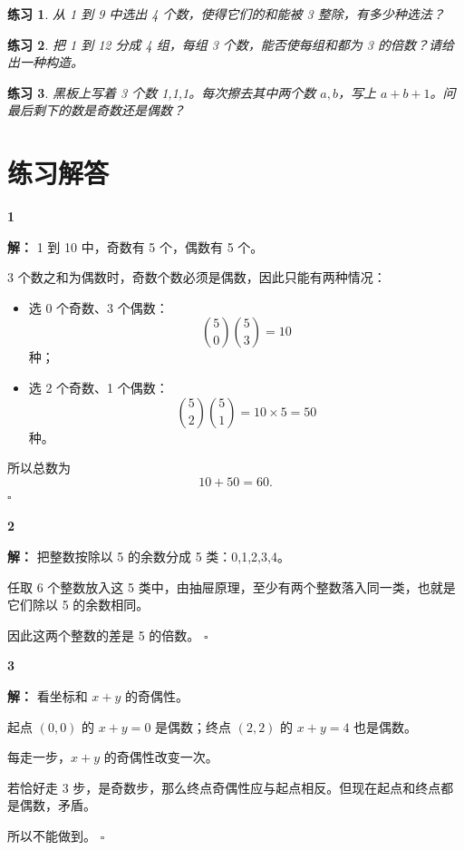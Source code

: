 \documentclass[11pt,a4paper,fontset=fandol]{ctexart}
\theoremstyle{formaltheorem}
\theoremstyle{formalexample}
\newtheorem{exercise}{练习}[section]
\newenvironment{solution}{\par\noindent\textbf{解：}}{\hfill$\square$\par}
\begin{document}
\begin{exercise}
从 1 到 9 中选出 4 个数，使得它们的和能被 3 整除，有多少种选法？
\end{exercise}

\begin{exercise}
把 1 到 12 分成 4 组，每组 3 个数，能否使每组和都为 3 的倍数？请给出一种构造。
\end{exercise}

\begin{exercise}
黑板上写着 3 个数 1,1,1。每次擦去其中两个数 $a,b$，写上 $a+b+1$。问最后剩下的数是奇数还是偶数？
\end{exercise}

\newpage
\appendix
\section{练习解答}

\textbf{1}\begin{solution}
1 到 10 中，奇数有 5 个，偶数有 5 个。

3 个数之和为偶数时，奇数个数必须是偶数，因此只能有两种情况：
\begin{itemize}
  \item 选 0 个奇数、3 个偶数：
  \[
  \binom50\binom53=10
  \]
  种；
  \item 选 2 个奇数、1 个偶数：
  \[
  \binom52\binom51=10\times 5=50
  \]
  种。
\end{itemize}

所以总数为
\[
10+50=60.
\]
\end{solution}

\textbf{2}\begin{solution}
把整数按除以 5 的余数分成 5 类：0,1,2,3,4。

任取 6 个整数放入这 5 类中，由抽屉原理，至少有两个整数落入同一类，也就是它们除以 5 的余数相同。

因此这两个整数的差是 5 的倍数。
\end{solution}

\textbf{3}\begin{solution}
看坐标和 $x+y$ 的奇偶性。

起点 $(0,0)$ 的 $x+y=0$ 是偶数；终点 $(2,2)$ 的 $x+y=4$ 也是偶数。

每走一步，$x+y$ 的奇偶性改变一次。

若恰好走 3 步，是奇数步，那么终点奇偶性应与起点相反。但现在起点和终点都是偶数，矛盾。

所以不能做到。
\end{solution}
\end{document}
